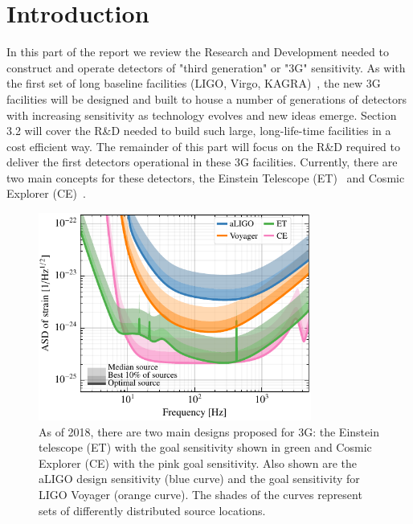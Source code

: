 \chapter{Introduction}
\label{sec:Intro}

In this part of the report we review the Research and Development needed to construct and operate detectors of "third generation" or "3G" sensitivity. As with the first set of long baseline facilities (LIGO, Virgo, KAGRA)~\cite{AdvancedVirgo2015,AdvancedLIGO2015,KAGRA2013}, the new 3G facilities will be designed and built to house a number of generations of detectors with increasing sensitivity as technology evolves and new ideas emerge. Section 3.2 will cover the R\&D needed to build such large, long-life-time facilities in a cost efficient way. The remainder of this part will focus on the R\&D required to deliver the first detectors operational in these 3G facilities. Currently, there are two main concepts for these detectors, the Einstein Telescope (ET)~\cite{ET2011} and Cosmic Explorer (CE)~\cite{CosmicExplorer2017}.

\begin{figure}[ht]
\centering
\includegraphics*[width= 0.8\textwidth]{Figures/noises_percentiles.pdf}
\caption{As of 2018, there are two main designs proposed for 3G:  the Einstein telescope (ET) \cite{ET2011} with the goal sensitivity shown in green and Cosmic Explorer (CE) \cite{CosmicExplorer2017} with the pink goal sensitivity.  Also shown are the aLIGO design sensitivity (blue curve) and the goal sensitivity for LIGO Voyager (orange curve). The shades of the curves represent sets of differently distributed source locations.}
\label{fig:3GSens}
\end{figure}

